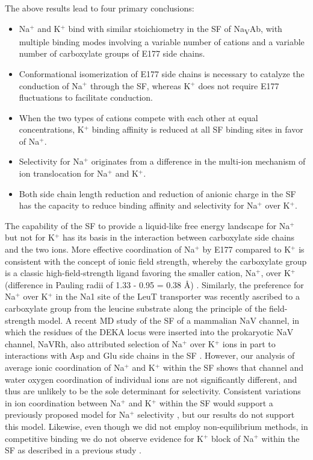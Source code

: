 \begin{refsection}
The above results lead to four primary conclusions: 
\begin{itemize}
\item Na$^+$ and K$^+$ bind with similar stoichiometry in the SF of Na\textsubscript{V}Ab, with multiple binding modes involving a variable number of cations and a variable number of carboxylate groups of E177 side chains.
\item Conformational isomerization of E177 side chains is necessary to catalyze the conduction of Na$^+$ through the SF, whereas K$^+$ does not require E177 fluctuations to facilitate conduction. 
\item When the two types of cations compete with each other at equal concentrations, K$^+$ binding affinity is reduced at all SF binding sites in favor of Na$^+$. 
\item Selectivity for Na$^+$ originates from a difference in the multi-ion mechanism of ion translocation for Na$^+$ and K$^+$. 
\item Both side chain length reduction and reduction of anionic charge in the SF has the capacity to reduce binding affinity and selectivity for Na$^+$ over K$^+$.
\end{itemize}

The capability of the SF to provide a liquid-like free energy landscape for Na$^+$ but not for K$^+$ has its basis in the interaction between carboxylate side chains and the two ions. More effective coordination of Na$^+$ by E177 compared to K$^+$ is consistent with the concept of ionic field strength, whereby the carboxylate group is a classic high-field-strength ligand favoring the smaller cation, Na$^+$, over K$^+$ (difference in Pauling radii of 1.33 - 0.95 = 0.38 \AA) \cite{Eisenman:1962dy}.  Similarly, the preference for Na$^+$ over K$^+$ in the Na1 site of the LeuT transporter was recently ascribed to a carboxylate group from the leucine substrate \cite{Yu:2010dj} along the principle of the field-strength model.  A recent MD study of the SF of a mammalian NaV channel, in which the residues of the DEKA locus were inserted into the prokaryotic NaV channel, NaVRh, also attributed selection of Na$^+$ over K$^+$ ions in part to interactions with Asp and Glu side chains in the SF \cite{Xia:2013dv}. However, our analysis of average ionic coordination of Na$^+$ and K$^+$ within the SF shows that channel and water oxygen coordination of individual ions are not significantly different, and thus are unlikely to be the sole determinant for selectivity. Consistent variations in ion coordination between Na$^+$ and K$^+$ within the SF would support a previously proposed model for Na$^+$ selectivity \cite{Corry:2012ge}, but our results do not support this model. Likewise, even though we did not employ non-equilibrium methods, in competitive binding we do not observe evidence for K$^+$ block of Na$^+$ within the SF as described in a previous study \cite{Ngo:2016es}.  


\end{refsection}
